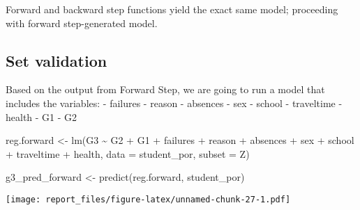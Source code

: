 \documentclass[
]{article}
\newenvironment{Shaded}{\begin{snugshade}}{\end{snugshade}}
\newcommand{\AttributeTok}[1]{\textcolor[rgb]{0.77,0.63,0.00}{#1}}
\newcommand{\DecValTok}[1]{\textcolor[rgb]{0.00,0.00,0.81}{#1}}
\newcommand{\FunctionTok}[1]{\textcolor[rgb]{0.00,0.00,0.00}{#1}}
\newcommand{\NormalTok}[1]{#1}
\newcommand{\OtherTok}[1]{\textcolor[rgb]{0.56,0.35,0.01}{#1}}
\newcommand{\SpecialCharTok}[1]{\textcolor[rgb]{0.00,0.00,0.00}{#1}}
\newcommand{\StringTok}[1]{\textcolor[rgb]{0.31,0.60,0.02}{#1}}
\begin{document}
Forward and backward step functions yield the exact same model;
proceeding with forward step-generated model.

\hypertarget{set-validation}{%
\subsection{Set validation}\label{set-validation}}

Based on the output from Forward Step, we are going to run a model that
includes the variables: - failures - reason - absences - sex - school -
traveltime - health - G1 - G2

\begin{Shaded}
\begin{Highlighting}[]
\NormalTok{reg.forward }\OtherTok{\textless{}{-}} \FunctionTok{lm}\NormalTok{(G3 }\SpecialCharTok{\textasciitilde{}}\NormalTok{ G2 }\SpecialCharTok{+}\NormalTok{ G1 }\SpecialCharTok{+}\NormalTok{ failures }\SpecialCharTok{+}\NormalTok{ reason }\SpecialCharTok{+}\NormalTok{ absences }\SpecialCharTok{+}\NormalTok{ sex }\SpecialCharTok{+}\NormalTok{ school }\SpecialCharTok{+}\NormalTok{ traveltime }\SpecialCharTok{+}\NormalTok{ health, }\AttributeTok{data =}\NormalTok{ student\_por, }\AttributeTok{subset =}\NormalTok{ Z)}

\NormalTok{g3\_pred\_forward }\OtherTok{\textless{}{-}} \FunctionTok{predict}\NormalTok{(reg.forward, student\_por)}
\end{Highlighting}
\end{Shaded}

\begin{Shaded}
\end{Shaded}

\texttt{[image: report\_files/figure-latex/unnamed-chunk-27-1.pdf]}

\begin{Shaded}
\end{Shaded}
\end{document}
